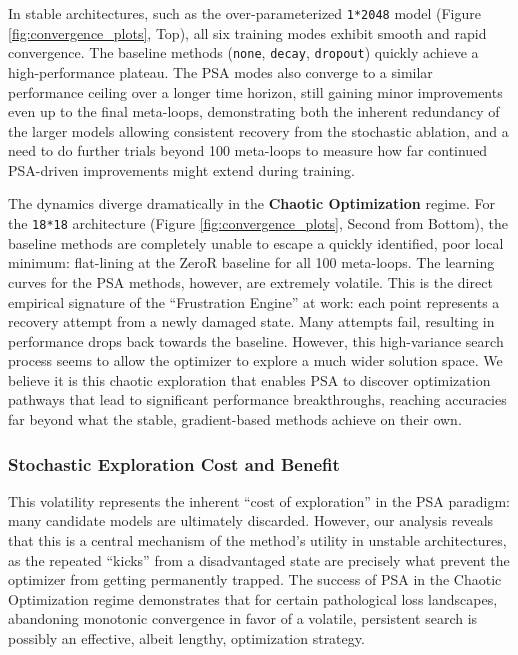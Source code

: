 \documentclass[conference]{IEEEtran}
\begin{document}
In stable architectures, such as the over-parameterized \texttt{1*2048} model (Figure \ref{fig:convergence_plots}, Top), all six training modes exhibit smooth and rapid convergence. The baseline methods (\verb|none|, \verb|decay|, \verb|dropout|) quickly achieve a high-performance plateau. The PSA modes also converge to a similar performance ceiling over a longer time horizon, still gaining minor improvements even up to the final meta-loops, demonstrating both the inherent redundancy of the larger models allowing consistent recovery from the stochastic ablation, and a need to do further trials beyond 100 meta-loops to measure how far continued PSA-driven improvements might extend during training.

The dynamics diverge dramatically in the \textbf{Chaotic Optimization} regime. For the \texttt{18*18} architecture (Figure \ref{fig:convergence_plots}, Second from Bottom), the baseline methods are completely unable to escape a quickly identified, poor local minimum: flat-lining at the ZeroR baseline for all 100 meta-loops. The learning curves for the PSA methods, however, are extremely volatile. This is the direct empirical signature of the ``Frustration Engine'' at work: each point represents a recovery attempt from a newly damaged state. Many attempts fail, resulting in performance drops back towards the baseline. However, this high-variance search process seems to allow the optimizer to explore a much wider solution space. We believe it is this chaotic exploration that enables PSA to discover optimization pathways that lead to significant performance breakthroughs, reaching accuracies far beyond what the stable, gradient-based methods achieve on their own.

\subsubsection{Stochastic Exploration Cost and Benefit}

This volatility represents the inherent ``cost of exploration'' in the PSA paradigm: many candidate models are ultimately discarded. However, our analysis reveals that this is a central mechanism of the method's utility in unstable architectures, as the repeated ``kicks'' from a disadvantaged state are precisely what prevent the optimizer from getting permanently trapped. The success of PSA in the Chaotic Optimization regime demonstrates that for certain pathological loss landscapes, abandoning monotonic convergence in favor of a volatile, persistent search is possibly an effective, albeit lengthy, optimization strategy.
\end{document}

